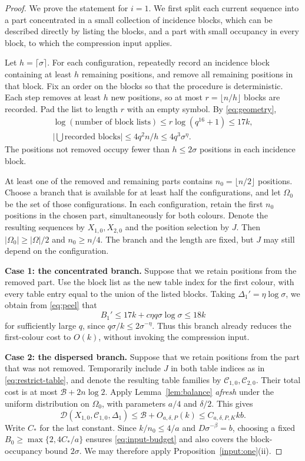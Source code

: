 \documentclass[11pt]{article}
\theoremstyle{definition}
\theoremstyle{remark}
\newcommand{\CC}{\mathcal C}
\newcommand{\BB}{\mathcal B}
\newcommand{\DD}{\mathcal D}
\begin{document}
\begin{proof}
We prove the statement for $i=1$. We first split each current sequence
into a part concentrated in a small collection of incidence blocks,
which can be described directly by listing the blocks, and a part with
small occupancy in every block, to which the compression input applies.

Let $h=\lceil\sigma\rceil$. For each configuration, repeatedly record
an incidence block containing at least $h$ remaining positions, and
remove all remaining positions in that block. Fix an order on the
blocks so that the procedure is deterministic. Each step removes at
least $h$ new positions, so at most $r=\lfloor n/h\rfloor$ blocks are
recorded. Pad the list to length $r$ with an empty symbol. By
\eqref{eq:geometry},
\begin{equation}\label{eq:peel}
 \begin{gathered}
 \log(\text{number of block lists})
 \le r\log(q^{16}+1)\le17k,\\
 \left|\bigcup\text{recorded blocks}\right|
 \le4q^2n/h\le4q^3\sigma^\eta.
 \end{gathered}
\end{equation}
The positions not removed occupy fewer than $h\le2\sigma$ positions
in each incidence block.

At least one of the removed and remaining parts contains
$n_0=\lfloor n/2\rfloor$ positions. Choose a branch that is available
for at least half the configurations, and let $\Omega_0$ be the set of
those configurations. In each configuration, retain the first $n_0$
positions in the chosen part, simultaneously for both colours. Denote
the resulting sequences by $X_{1,0},X_{2,0}$ and the position selection
by $J$. Then $|\Omega_0|\ge|\Omega|/2$ and $n_0\ge n/4$. The branch and
the length are fixed, but $J$ may still depend on the configuration.

\medskip
\noindent\textbf{Case 1: the concentrated branch.}
Suppose that we retain positions from the removed part. Use the block
list as the new table index for the first colour, with every table
entry equal to the union of the listed blocks. Taking
$\Delta_1'=\eta\log\sigma$, we obtain from \eqref{eq:peel} that
\[
 B_1'\le17k+c\eta q\sigma\log\sigma\le18k
\]
for sufficiently large $q$, since $q\sigma/k\le2\sigma^{-\eta}$.
Thus this branch already reduces the first-colour cost to $O(k)$,
without invoking the compression input.

\medskip
\noindent\textbf{Case 2: the dispersed branch.}
Suppose that we retain positions from the part that was not removed.
Temporarily include $J$ in both table indices as in
\eqref{eq:restrict-table}, and denote the resulting table families by
$\CC_{1,0},\CC_{2,0}$. Their total cost is at most
$\BB+2n\log2$. Apply Lemma~\ref{lem:balance} \emph{afresh} under the
uniform distribution on $\Omega_0$, with parameters $a/4$ and
$\delta/2$. This gives
\[
 \DD(X_{1,0},\CC_{1,0},\Delta_1)
 \le\BB+O_{a,\delta,P}(k)
 \le C_{a,\delta,P,K}kb.
\]
Write $C_*$ for the last constant. Since $k/n_0\le4/a$ and
$D\sigma^{-\beta}=b$, choosing a fixed
$B_0\ge\max\{2,4C_*/a\}$ ensures \eqref{eq:input-budget} and also
covers the block-occupancy bound $2\sigma$. We may therefore apply
Proposition~\ref{input:one}\textup{(ii)}.


\end{proof}
\end{document}
